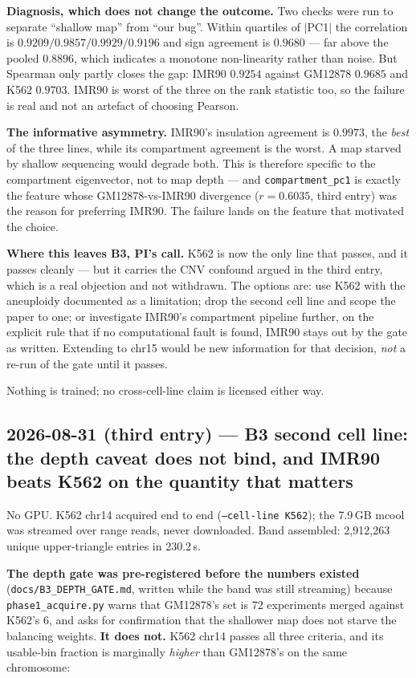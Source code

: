 \documentclass[11pt,a4paper]{article}
\newcommand{\code}[1]{\texttt{\small #1}}
\begin{document}
\textbf{Diagnosis, which does not change the outcome.} Two checks were run to
separate ``shallow map'' from ``our bug''. Within quartiles of $|$PC1$|$ the
correlation is $0.9209 / 0.9857 / 0.9929 / 0.9196$ and sign agreement is
$0.9680$ --- far above the pooled $0.8896$, which indicates a monotone
non-linearity rather than noise. But Spearman only partly closes the gap:
IMR90 $0.9254$ against GM12878 $0.9685$ and K562 $0.9703$. IMR90 is worst of
the three on the rank statistic too, so the failure is real and not an artefact
of choosing Pearson.

\textbf{The informative asymmetry.} IMR90's insulation agreement is $0.9973$,
the \emph{best} of the three lines, while its compartment agreement is the
worst. A map starved by shallow sequencing would degrade both. This is
therefore specific to the compartment eigenvector, not to map depth --- and
\code{compartment\_pc1} is exactly the feature whose GM12878-vs-IMR90
divergence ($r = 0.6035$, third entry) was the reason for preferring IMR90.
The failure lands on the feature that motivated the choice.

\textbf{Where this leaves B3, PI's call.} K562 is now the only line that
passes, and it passes cleanly --- but it carries the CNV confound argued in the
third entry, which is a real objection and not withdrawn. The options are: use
K562 with the aneuploidy documented as a limitation; drop the second cell line
and scope the paper to one; or investigate IMR90's compartment pipeline
further, on the explicit rule that if no computational fault is found, IMR90
stays out by the gate as written. Extending to chr15 would be new information
for that decision, \emph{not} a re-run of the gate until it passes.

Nothing is trained; no cross-cell-line claim is licensed either way.

\subsection*{2026-08-31 (third entry) --- B3 second cell line: the depth
caveat does not bind, and IMR90 beats K562 on the quantity that matters}

No GPU. K562 chr14 acquired end to end (\code{--cell-line K562}); the
7.9\,GB mcool was streamed over range reads, never downloaded. Band assembled:
2{,}912{,}263 unique upper-triangle entries in 230.2\,s.

\textbf{The depth gate was pre-registered before the numbers existed}
(\code{docs/B3\_DEPTH\_GATE.md}, written while the band was still streaming)
because \code{phase1\_acquire.py} warns that GM12878's set is 72 experiments
merged against K562's 6, and asks for confirmation that the shallower map does
not starve the balancing weights. \textbf{It does not.} K562 chr14 passes all
three criteria, and its usable-bin fraction is marginally \emph{higher} than
GM12878's on the same chromosome:
\end{document}
